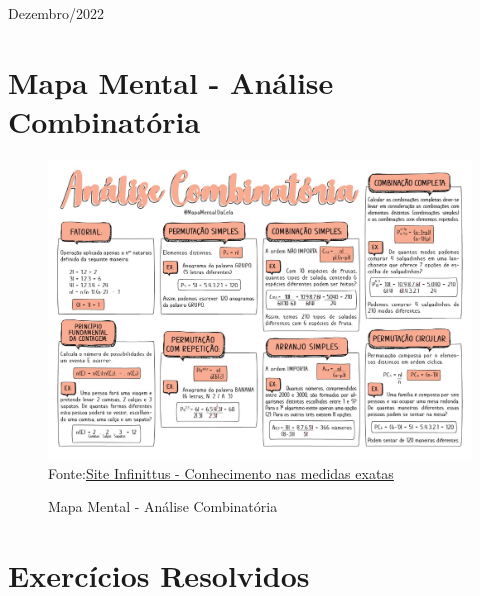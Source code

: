 \documentclass[a4paper,12pt]{article}
\begin{document}
\vfill

\begin{center}
  \begin{large}
    Dezembro/2022
  \end{large}
  
\end{center}

\thispagestyle{empty} %

\newpage
\setcounter{page}{0}

\tableofcontents

\listoffigures

\listoftables

\thispagestyle{empty}%

\newpage

\section{Mapa Mental - Análise Combinatória}

\setcounter{figure}{0}
\begin{figure}[htb]
\centering
\caption{Mapa Mental - Análise Combinatória}
\includegraphics[scale=0.35]{../../imagens/mapa-mental-analise-combinatoria.jpeg}
\label{mapa-mental-analise-combinatoria}
Fonte:\href{https://infinittusexatas.com.br/analise-combinatoria-resumos-e-mapas-mentais/}{Site Infinittus - Conhecimento nas medidas exatas}
\end{figure}

\section{Exercícios Resolvidos}
\end{document}
